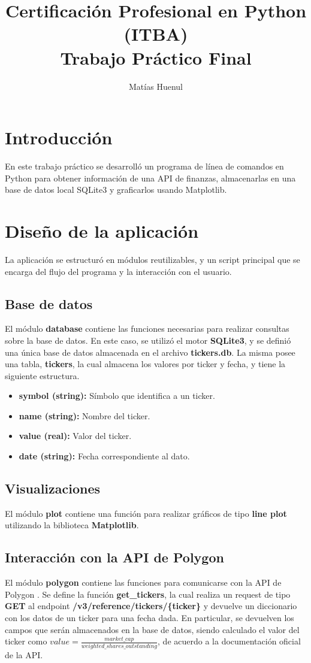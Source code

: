 \documentclass{article}
\title{Certificación Profesional en Python (ITBA) \\
Trabajo Práctico Final}
\author{Matías Huenul}
\date{}
\begin{document}
\maketitle
\tableofcontents
\newpage

\section{Introducción}
En este trabajo práctico se desarrolló un programa de línea de comandos en Python para
obtener información de una API de finanzas, almacenarlas en una base de datos local SQLite3
y graficarlos usando Matplotlib.

\section{Diseño de la aplicación}
La aplicación se estructuró en módulos reutilizables, y un script principal que se encarga
del flujo del programa y la interacción con el usuario.

\subsection{Base de datos}
El módulo \textbf{database} contiene las funciones necesarias para realizar consultas
sobre la base de datos. En este caso, se utilizó el motor \textbf{SQLite3},
y se definió una única base de datos almacenada en el archivo \textbf{tickers.db}.
La misma posee una tabla, \textbf{tickers}, la cual almacena los valores por ticker y fecha, y
tiene la siguiente estructura.

\begin{itemize}
    \item \textbf{symbol (string):} Símbolo que identifica a un ticker.
    \item \textbf{name (string):} Nombre del ticker.
    \item \textbf{value (real):} Valor del ticker.
    \item \textbf{date (string):} Fecha correspondiente al dato.
\end{itemize}

\subsection{Visualizaciones}
El módulo \textbf{plot} contiene una función para realizar gráficos de tipo \textbf{line plot}
utilizando la biblioteca \textbf{Matplotlib}.

\subsection{Interacción con la API de Polygon}
El módulo \textbf{polygon} contiene las funciones para comunicarse con la API de
Polygon \cite{polygon_api}. Se define la función \textbf{get\_tickers}, la cual realiza un request
de tipo \textbf{GET} al endpoint \textbf{/v3/reference/tickers/\{ticker\}} y devuelve un diccionario con
los datos de un ticker para una fecha dada. En particular, se devuelven los campos que serán
almacenados en la base de datos, siendo calculado el valor del ticker
como $value = \frac{market\_cap}{weighted\_shares\_outstanding}$, de acuerdo a la documentación oficial
de la API.
\end{document}

